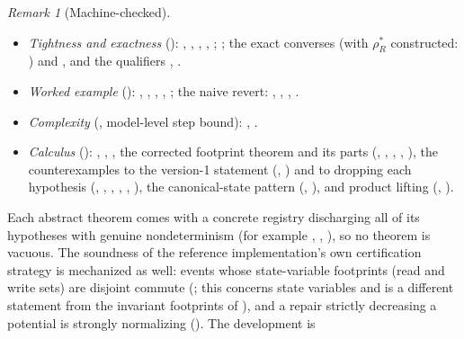 \documentclass[11pt,a4paper]{article}
\theoremstyle{plain}
\theoremstyle{definition}
\theoremstyle{remark}
\newtheorem{remark}[theorem]{Remark}
\begin{document}
\begin{remark}[Machine-checked]
\begin{itemize}[leftmargin=*,nosep]
\item \emph{Tightness and exactness} ():
  , , ,
  , ; ;
  the exact converses  (with $\rho_R^*$ constructed:
  ) and , and the qualifiers
  , .
\item \emph{Worked example} (): ,
  , , , ;
  the naive revert: , ,
  , .
\item \emph{Complexity} (, model-level step bound):
  , .
\item \emph{Calculus} (): ,
  , , the
  corrected footprint theorem and its parts (,
  , ,
  , ), the
  counterexamples to the version-1 statement
  (,
  ) and to dropping each hypothesis
  (, ,
  , ,
  , ), the
  canonical-state pattern (,
  ), and product lifting
  (, ).
\end{itemize}
Each abstract theorem comes with a concrete registry discharging all of its
hypotheses with genuine nondeterminism (for example ,
, ), so no theorem is vacuous.
The soundness of the reference implementation's own certification strategy
is mechanized as well: events whose state-variable footprints (read and
write sets) are disjoint commute (; this concerns
state variables and is a different statement from the invariant footprints of
), and a repair strictly decreasing a potential is
strongly normalizing ().  The development is

\end{remark}
\end{document}
